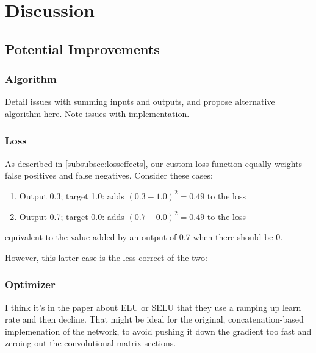 \chapter{Discussion}

\section{Potential Improvements}

\subsection{Algorithm}
Detail issues with summing inputs and outputs, and propose alternative algorithm 
here. Note issues with implementation.

\subsection{Loss}
As described in \ref{subsubsec:losseffects}, our custom loss function equally 
weights false positives and false negatives. Consider these cases:

\begin{enumerate}
	\item Output 0.3; target 1.0: adds $(0.3-1.0)^2=0.49$ to the loss
	\item Output 0.7; target 0.0: adds $(0.7-0.0)^2=0.49$ to the loss
\end{enumerate}
equivalent to the value added by an output of 0.7 when there should be 0. 

However, this latter case is the less correct of the two: 

\subsection{Optimizer}
I think it's in the paper about ELU or SELU that they use a ramping up learn 
rate and then decline. That might be ideal for the original, concatenation-based 
implemenation of the network, to avoid pushing it down the gradient too fast and 
zeroing out the convolutional matrix sections.
